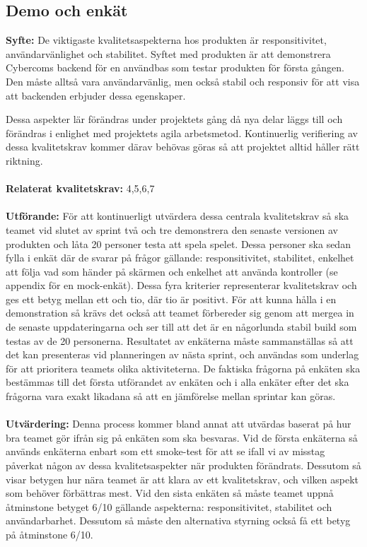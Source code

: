 \documentclass[10pt]{article}
\begin{document}
	\subsection{Demo och enkät}
	\textbf{Syfte:}	De viktigaste kvalitetsaspekterna hos produkten är responsitivitet, användarvänlighet och stabilitet. Syftet med produkten är att demonstrera Cybercoms backend för en användbas som testar produkten för första gången. Den måste alltså vara användarvänlig, men också stabil och responsiv för att visa att backenden erbjuder dessa egenskaper.
	
	Dessa aspekter lär förändras under projektets gång då nya delar läggs till och förändras i enlighet med projektets agila arbetsmetod. Kontinuerlig verifiering av dessa kvalitetskrav kommer därav behövas göras så att projektet alltid håller rätt riktning.
	\\\\
	\textbf{Relaterat kvalitetskrav:} 4,5,6,7
	\\\\
	\textbf{Utförande:} För att kontinuerligt utvärdera dessa centrala kvalitetskrav så ska teamet vid slutet av sprint två och tre demonstrera den senaste versionen av produkten och låta 20 personer testa att spela spelet. Dessa personer ska sedan fylla i enkät där de svarar på frågor gällande: responsitivitet, stabilitet, enkelhet att följa vad som händer på skärmen och enkelhet att använda kontroller (se appendix för en mock-enkät). Dessa fyra kriterier representerar kvalitetskrav och ges ett betyg mellan ett och tio, där tio är positivt. För att kunna hålla i en demonstration så krävs det också att teamet förbereder sig genom att mergea in de senaste uppdateringarna och ser till att det är en någorlunda stabil build som testas av de 20 personerna. Resultatet av enkäterna måste sammanställas så att det kan presenteras vid planneringen av nästa sprint, och användas som underlag för att prioritera teamets olika aktiviteterna. De faktiska frågorna på enkäten ska bestämmas till det första utförandet av enkäten och i alla enkäter efter det ska frågorna vara exakt likadana så att en jämförelse mellan sprintar kan göras.
	\\\\
	\textbf{Utvärdering:} Denna process kommer bland annat att utvärdas baserat på hur bra teamet gör ifrån sig på enkäten som ska besvaras. Vid de första enkäterna så används enkäterna enbart som ett smoke-test för att se ifall vi av misstag påverkat någon av dessa kvalitetsaspekter när produkten förändrats. Dessutom så visar betygen hur nära teamet är att klara av ett kvalitetskrav, och vilken aspekt som behöver förbättras mest. Vid den sista enkäten så måste teamet uppnå åtminstone betyget 6/10 gällande aspekterna: responsitivitet, stabilitet och användarbarhet. Dessutom så måste den alternativa styrning också få ett betyg på åtminstone 6/10.
\end{document}
